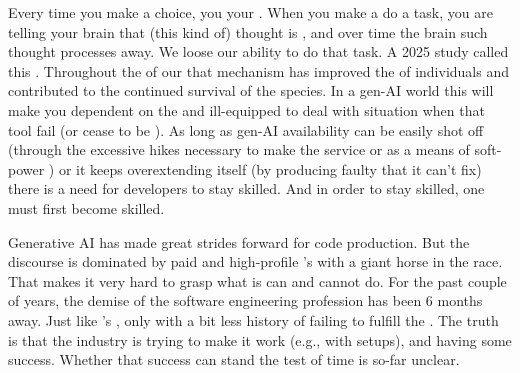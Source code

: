 Every time you make a choice, you  your . When you make a  do a task, you are telling your brain that (this kind of) thought is , and over time the brain  such thought processes away. We loose our ability to do that task. A 2025 study called this \cite{kosmyna2025brainchatgptaccumulationcognitive}. Throughout the  of our  that mechanism has improved the  of individuals and contributed to the continued survival of the species. In a gen-AI world this will make you dependent on the  and ill-equipped to deal with situation when that tool fail (or cease to be ). As long as gen-AI availability can be easily shot off (through the excessive  hikes necessary to make the service  or as a means of soft-power ) or it keeps overextending itself (by producing faulty  that it can't fix) there is a need for developers to stay skilled. And in order to stay skilled, one must first become skilled.

Generative AI has made great strides forward for code production. But the discourse is dominated by paid  and high-profile 's with a giant horse in the race. That makes it very hard to grasp what is can and cannot do. For the past couple of years, the demise of the software engineering profession has been 6 months away. Just like 's , only with a bit less history of failing to fulfill the . The truth is that the industry is trying to make it work (e.g., with  setups), and having some success. Whether that success can stand the test of time is so-far unclear.

